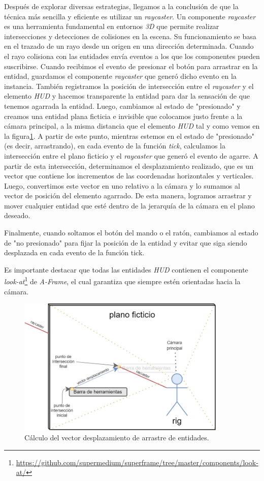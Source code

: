 \documentclass[a4paper, 11pt]{book}
\begin{document}
Después de explorar diversas estrategias, llegamos a la conclusión de que la técnica más sencilla y eficiente es utilizar un \emph{raycaster}. Un componente \emph{raycaster} es una herramienta fundamental en entornos \emph{3D} que permite realizar intersecciones y detecciones de colisiones en la escena. Su funcionamiento se basa en el trazado de un rayo desde un origen en una dirección determinada. Cuando el rayo colisiona con las entidades envía eventos a los que los componentes pueden suscribirse. Cuando recibimos el evento de presionar el botón para arrastrar en la entidad, guardamos el componente \emph{raycaster} que generó dicho evento en la instancia. 
También registramos la posición de intersección entre el \emph{raycaster} y el elemento \emph{HUD} y hacemos transparente la entidad para dar la sensación de que tenemos agarrada la entidad. Luego, cambiamos al estado de "presionado" y creamos una entidad plana ficticia e invisible que colocamos justo frente a la cámara principal, a la misma distancia que el elemento \emph{HUD} tal y como vemos en la figura\ref{fig:raycaster}. A partir de este punto, mientras estemos en el estado de "presionado" (es decir, arrastrando), en cada evento de la función \emph{tick}, calculamos la intersección entre el plano ficticio y el \emph{raycaster} que generó el evento de agarre. A partir de esta intersección, determinamos el desplazamiento realizado, que es un vector que contiene los incrementos de las coordenadas horizontales y verticales. Luego, convertimos este vector en uno relativo a la cámara y lo sumamos al vector de posición del elemento agarrado. De esta manera, logramos arrastrar y mover cualquier entidad que esté dentro de la jerarquía de la cámara en el plano deseado.

Finalmente, cuando soltamos el botón del mando o el ratón, cambiamos al estado de "no presionado" para fijar la posición de la entidad y evitar que siga siendo desplazada en cada evento de la función tick.

Es importante destacar que todas las entidades \emph{HUD} contienen el componente \emph{look-at}\footnote{\url{https://github.com/supermedium/superframe/tree/master/components/look-at/}} de \emph{A-Frame}, el cual garantiza que siempre estén orientadas hacia la cámara.

\begin{figure}[h]
  \centering
  \includegraphics[width=10cm, keepaspectratio]{img/custom-draggable.png}
  \caption{Cálculo del vector desplazamiento de arrastre de entidades.}
  \label{fig:raycaster}
\end{figure}
\end{document}
